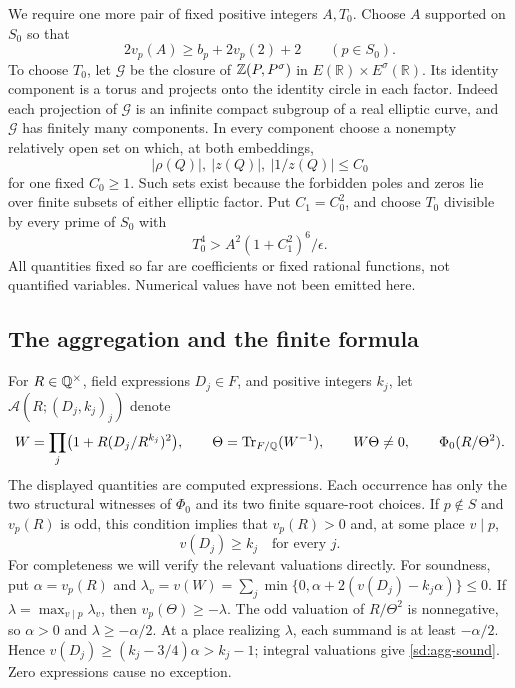 We require one more pair of fixed positive integers $A,T_0$.
Choose $A$ supported on $S_0$ so that
\begin{equation}\label{sd:A}
 2v_p(A)\ge b_p+2v_p(2)+2\qquad(p\in S_0).
\end{equation}
To choose $T_0$, let $\mathcal G$ be the closure of
$\mathbb Z(P,P^\sigma)$ in $E(\mathbb R)\times E^\sigma(\mathbb R)$.
Its identity component is a torus and projects onto the identity circle
in each factor. Indeed each projection of $\mathcal G$ is an infinite
compact subgroup of a real elliptic curve, and $\mathcal G$ has finitely
many components. In every component choose a nonempty relatively open set
on which, at both embeddings,
\begin{equation}\label{sd:goodsets}
                 |\rho(Q)|,\ |z(Q)|,\ |1/z(Q)|\le C_0
\end{equation}
for one fixed $C_0\ge1$. Such sets exist because the forbidden poles and
zeros lie over finite subsets of either elliptic factor. Put $C_1=C_0^2$,
and choose $T_0$ divisible by every prime of $S_0$ with
\begin{equation}\label{sd:T0}
 T_0^4>A^2(1+C_1^2)^6/\epsilon.
\end{equation}
All quantities fixed so far are coefficients or fixed rational functions,
not quantified variables. Numerical values have not been emitted here.

\subsection{The aggregation and the finite formula}

For $R\in\mathbb Q^\times$, field expressions $D_j\in F$, and positive integers
$k_j$, let $\mathcal A(R;(D_j,k_j)_j)$ denote
\begin{equation}\label{sd:agg}
 W=\prod_j\bigl(1+R(D_j/R^{k_j})^2\bigr),\qquad
 \Theta=\operatorname{Tr}_{F/\mathbb Q}(W^{-1}),\qquad W\Theta\ne0,\qquad
 \Phi_0(R/\Theta^2).
\end{equation}
The displayed quantities are computed expressions. Each occurrence has
only the two structural witnesses of $\Phi_0$ and its two finite square-root
choices. If $p\notin S$ and $v_p(R)$ is odd, this condition implies that
$v_p(R)>0$ and, at some place $v\mid p$,
\begin{equation}\label{sd:agg-sound}
                       v(D_j)\ge k_j\quad\text{for every }j.
\end{equation}
For completeness we will verify the relevant valuations directly.
For soundness, put $\alpha=v_p(R)$ and
$\lambda_v=v(W)=\sum_j\min\{0,\alpha+2(v(D_j)-k_j\alpha)\}\le0$.
If $\lambda=\max_{v\mid p}\lambda_v$, then
$v_p(\Theta)\ge-\lambda$. The odd valuation of $R/\Theta^2$ is nonnegative,
so $\alpha>0$ and $\lambda\ge-\alpha/2$. At a place realizing $\lambda$,
each summand is at least $-\alpha/2$. Hence
$v(D_j)\ge(k_j-3/4)\alpha>k_j-1$; integral valuations give
\eqref{sd:agg-sound}. Zero expressions cause no exception.

